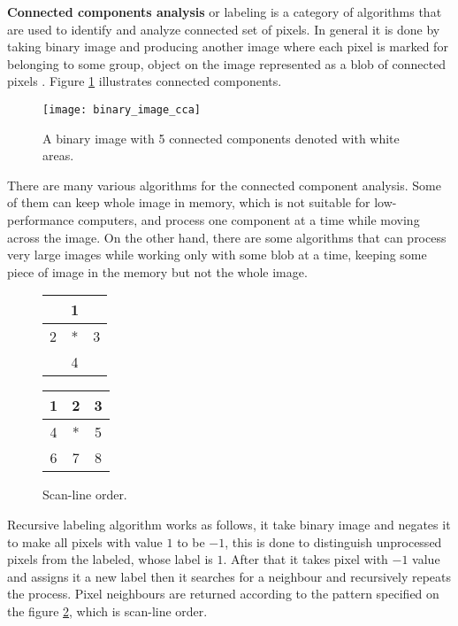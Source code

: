 \documentclass[../../../../main]{subfiles}
\begin{document}
\textbf{Connected components analysis} or labeling is a category of algorithms that are used to identify and analyze connected set of pixels. In general it is done by taking binary image and producing another image where each pixel is marked for belonging to some group, object on the image represented as a blob of connected pixels \cite{binary_image_analysis_washington}. Figure \ref{fig:binaryImageCca} illustrates connected components.

\begin{figure} [!ht]
  \centering    
    \texttt{[image: binary\_image\_cca]}
    \label{fig:binaryImageCca}
  \caption{A binary image with 5 connected components denoted with white areas.}
\end{figure}

There are many various algorithms for the connected component analysis. Some of them can keep whole image in memory, which is not suitable for low-performance computers, and process one component at a time while moving across the image. On the other hand, there are some algorithms that can process very large images while working only with some blob at a time, keeping some piece of image in the memory but not the whole image.

\begin{figure} [!ht]
  \centering    
    \begin{tabular}{ |c|c|c| }
        \hline
        &1&\\
        \hline
        2& *& 3\\
        \hline
        & 4&\\
        \hline
    \end{tabular}
     \begin{tabular}{ |c|c|c| }
        \hline
        1& 2& 3\\
        \hline
        4& *& 5\\
        \hline
        6& 7& 8\\
        \hline
    \end{tabular}
    \label{fig:recursiveCcPatterns}
  \caption{Scan-line order.}
\end{figure}

Recursive labeling algorithm works as follows, it take binary image and negates it to make all pixels with value $1$ to be $-1$, this is done to distinguish unprocessed pixels from the labeled, whose label is $1$. After that it takes pixel with $-1$ value and assigns it a new label then it searches for a neighbour and recursively repeats the process. Pixel neighbours are returned according to the pattern specified on the figure \ref{fig:recursiveCcPatterns}, which is scan-line order.
\end{document}
